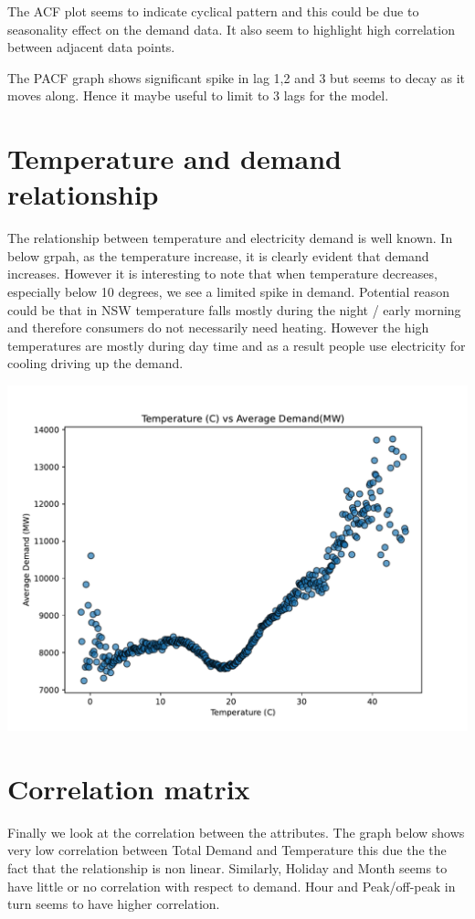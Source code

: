 \documentclass[mstat,12pt]{unswthesis}
\begin{document}
The ACF plot seems to indicate cyclical pattern and this could be due to
seasonality effect on the demand data. It also seem to highlight high
correlation between adjacent data points.

The PACF graph shows significant spike in lag 1,2 and 3 but seems to
decay as it moves along. Hence it maybe useful to limit to 3 lags for
the model.

\section{Temperature and demand
relationship}\label{temperature-and-demand-relationship}

The relationship between temperature and electricity demand is well
known. In below grpah, as the temperature increase, it is clearly
evident that demand increases. However it is interesting to note that
when temperature decreases, especially below 10 degrees, we see a
limited spike in demand. Potential reason could be that in NSW
temperature falls mostly during the night / early morning and therefore
consumers do not necessarily need heating. However the high temperatures
are mostly during day time and as a result people use electricity for
cooling driving up the demand.

\begin{center}\includegraphics[width=0.5\linewidth]{unsw-ZZSC9020-report-template_files/figure-latex/unnamed-chunk-11-17} \end{center}

\section{Correlation matrix}\label{correlation-matrix}

Finally we look at the correlation between the attributes. The graph
below shows very low correlation between Total Demand and Temperature
this due the the fact that the relationship is non linear. Similarly,
Holiday and Month seems to have little or no correlation with respect to
demand. Hour and Peak/off-peak in turn seems to have higher correlation.
\end{document}
